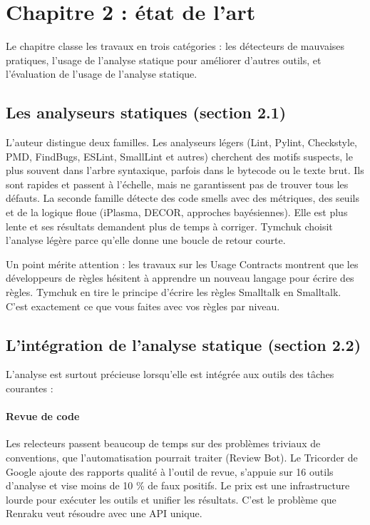 \documentclass[11pt,a4paper]{article}
\begin{document}
\section{Chapitre 2 : état de l’art}

Le chapitre classe les travaux en trois catégories : les détecteurs de mauvaises pratiques, l’usage de l’analyse statique pour améliorer d’autres outils, et l’évaluation de l’usage de l’analyse statique.

\subsection{Les analyseurs statiques (section 2.1)}

L’auteur distingue deux familles. Les analyseurs légers (Lint, Pylint, Checkstyle, PMD, FindBugs, ESLint, SmallLint et autres) cherchent des motifs suspects, le plus souvent dans l’arbre syntaxique, parfois dans le bytecode ou le texte brut. Ils sont rapides et passent à l’échelle, mais ne garantissent pas de trouver tous les défauts. La seconde famille détecte des code smells avec des métriques, des seuils et de la logique floue (iPlasma, DECOR, approches bayésiennes). Elle est plus lente et ses résultats demandent plus de temps à corriger. Tymchuk choisit l’analyse légère parce qu’elle donne une boucle de retour courte.

Un point mérite attention : les travaux sur les Usage Contracts montrent que les développeurs de règles hésitent à apprendre un nouveau langage pour écrire des règles. Tymchuk en tire le principe d’écrire les règles Smalltalk en Smalltalk. C’est exactement ce que vous faites avec vos règles par niveau.

\subsection{L’intégration de l’analyse statique (section 2.2)}

L’analyse est surtout précieuse lorsqu’elle est intégrée aux outils des tâches courantes :

\paragraph{Revue de code}

Les relecteurs passent beaucoup de temps sur des problèmes triviaux de conventions, que l’automatisation pourrait traiter (Review Bot). Le Tricorder de Google ajoute des rapports qualité à l’outil de revue, s’appuie sur 16 outils d’analyse et vise moins de 10 \% de faux positifs. Le prix est une infrastructure lourde pour exécuter les outils et unifier les résultats. C’est le problème que Renraku veut résoudre avec une API unique.
\end{document}
